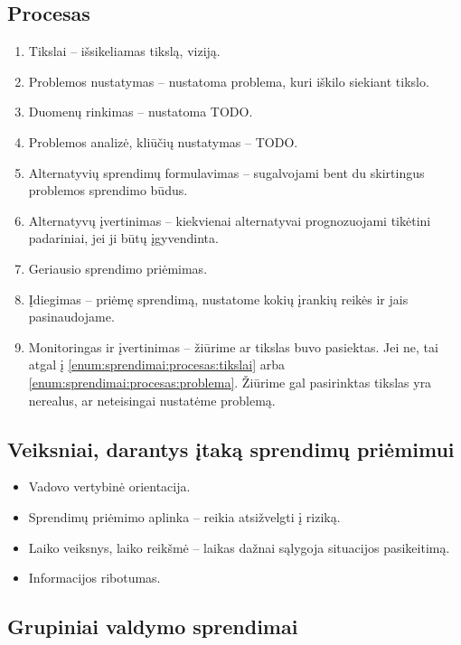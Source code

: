 \subsection{Procesas}

\begin{enumerate}
  \item \label{enum:sprendimai:procesas:tikslai} Tikslai – išsikeliamas
    tikslą, viziją.
  \item \label{enum:sprendimai:procesas:problema} Problemos nustatymas
    – nustatoma problema, kuri iškilo siekiant tikslo.
  \item Duomenų rinkimas – nustatoma TODO.
  \item Problemos analizė, kliūčių nustatymas – TODO.
  \item Alternatyvių sprendimų formulavimas – sugalvojami bent du
    skirtingus problemos sprendimo būdus.
  \item Alternatyvų įvertinimas – kiekvienai alternatyvai prognozuojami
    tikėtini padariniai, jei ji būtų įgyvendinta.
  \item Geriausio sprendimo priėmimas.
  \item Įdiegimas – priėmę sprendimą, nustatome kokių įrankių reikės
    ir jais pasinaudojame.
  \item Monitoringas ir įvertinimas – žiūrime ar tikslas buvo pasiektas.
    Jei ne, tai atgal į \ref{enum:sprendimai:procesas:tikslai} arba
    \ref{enum:sprendimai:procesas:problema}. Žiūrime gal pasirinktas
    tikslas yra nerealus, ar neteisingai nustatėme problemą.
\end{enumerate}

\subsection{Veiksniai, darantys įtaką sprendimų priėmimui}

\begin{itemize}
  \item Vadovo vertybinė orientacija.
  \item Sprendimų priėmimo aplinka – reikia atsižvelgti į riziką.
  \item Laiko veiksnys, laiko reikšmė – laikas dažnai sąlygoja situacijos
    pasikeitimą.
  \item Informacijos ribotumas.
\end{itemize}

\subsection{Grupiniai valdymo sprendimai}

